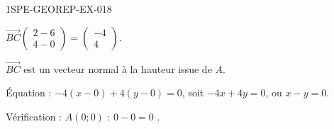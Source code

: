 \begin{corrige}{1SPE-GEOREP-EX-018}


$\vec{BC}\begin{pmatrix} 2 - 6 \\ 4 - 0 \end{pmatrix} = \begin{pmatrix} -4 \\ 4 \end{pmatrix}$.

$\vec{BC}$ est un vecteur normal à la hauteur issue de $A$.

Équation : $-4(x - 0) + 4(y - 0) = 0$, soit $-4x + 4y = 0$, ou $\boxed{x - y = 0}$.

Vérification : $A(0 ; 0)$ : $0 - 0 = 0$ \checkmark.

\end{corrige}
